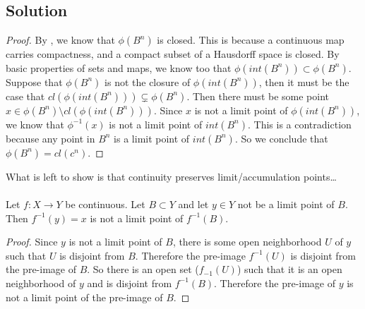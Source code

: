 \documentclass{article}
\theoremstyle{definition}
\begin{document}
\subsection*{Solution}
    \begin{proof}
    By , we know that $\phi(B^n)$ is closed. This is
    because a continuous map carries compactness, and a compact subset of 
    a Hausdorff space is closed. By basic properties of sets and maps, we 
    know too that $\phi(int(B^n))\subset \phi(B^n)$.
    Suppose that $\phi(B^n)$ is not the closure of $\phi(int(B^n))$, then 
    it must be the case that $cl(\phi(int(B^n)))\subsetneq \phi(B^n)$.
    Then there must be some point $x \in \phi(B^n) \setminus cl(\phi(int(B^n)))$.
    Since $x$ is not a limit point of $\phi(int(B^n))$, we know that 
    $\phi^{-1}(x)$ is not a limit point of $int(B^n)$. This is a 
    contradiction because any point in $B^n$ is a limit point of $int(B^n)$.
    So we conclude that $\phi(B^n) = cl(c^n)$.
    \end{proof}
    What is left to show is that continuity preserves limit/accumulation points\ldots
    \\\\
Let $f:X \to Y$ be continuous.
Let $B \subset Y$ and let $y \in Y$ not be a limit point of $B$.
Then $f^{-1}(y) = x$ is not a limit point of $f^{-1}(B)$.
\begin{proof}
   Since $y$ is not a limit point of $B$, there is some open neighborhood $U$ of $y$ such that $U$ is disjoint from $B$.
   Therefore the pre-image $f^{-1}(U)$ is disjoint from the pre-image of $B$.
   So there is an open set ($f_{-1}(U)$) such that it is an open neighborhood of $y$ and is disjoint from $f^{-1}(B)$.
   Therefore the pre-image of $y$ is not a limit point of the pre-image of $B$.
\end{proof}
\pagebreak
\end{document}
